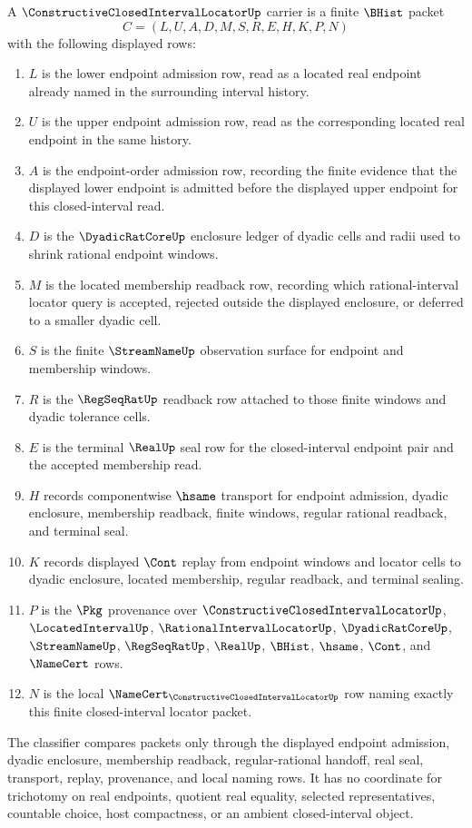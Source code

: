 \begin{definition}
\label{def:constructive-closed-interval-locator-carrier}
A $\ConstructiveClosedIntervalLocatorUp$ carrier is a finite $\BHist$ packet
$$
C=(L,U,A,D,M,S,R,E,H,K,P,N)
$$
with the following displayed rows:
\begin{enumerate}
\item $L$ is the lower endpoint admission row, read as a located real endpoint already named in the surrounding interval history.
\item $U$ is the upper endpoint admission row, read as the corresponding located real endpoint in the same history.
\item $A$ is the endpoint-order admission row, recording the finite evidence that the displayed lower endpoint is admitted before the displayed upper endpoint for this closed-interval read.
\item $D$ is the $\DyadicRatCoreUp$ enclosure ledger of dyadic cells and radii used to shrink rational endpoint windows.
\item $M$ is the located membership readback row, recording which rational-interval locator query is accepted, rejected outside the displayed enclosure, or deferred to a smaller dyadic cell.
\item $S$ is the finite $\StreamNameUp$ observation surface for endpoint and membership windows.
\item $R$ is the $\RegSeqRatUp$ readback row attached to those finite windows and dyadic tolerance cells.
\item $E$ is the terminal $\RealUp$ seal row for the closed-interval endpoint pair and the accepted membership read.
\item $H$ records componentwise $\hsame$ transport for endpoint admission, dyadic enclosure, membership readback, finite windows, regular rational readback, and terminal seal.
\item $K$ records displayed $\Cont$ replay from endpoint windows and locator cells to dyadic enclosure, located membership, regular readback, and terminal sealing.
\item $P$ is the $\Pkg$ provenance over $\ConstructiveClosedIntervalLocatorUp$, $\LocatedIntervalUp$, $\RationalIntervalLocatorUp$, $\DyadicRatCoreUp$, $\StreamNameUp$, $\RegSeqRatUp$, $\RealUp$, $\BHist$, $\hsame$, $\Cont$, and $\NameCert$ rows.
\item $N$ is the local $\NameCert_{\ConstructiveClosedIntervalLocatorUp}$ row naming exactly this finite closed-interval locator packet.
\end{enumerate}
The classifier compares packets only through the displayed endpoint admission, dyadic enclosure, membership readback, regular-rational handoff, real seal, transport, replay, provenance, and local naming rows. It has no coordinate for trichotomy on real endpoints, quotient real equality, selected representatives, countable choice, host compactness, or an ambient closed-interval object.
\end{definition}

